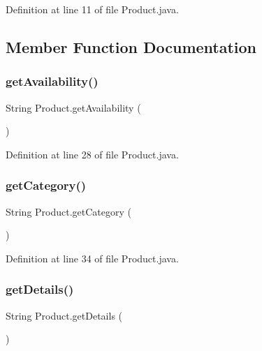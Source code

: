 Definition at line 11 of file Product.\+java.



\subsection{Member Function Documentation}
\mbox{\label{class_product_a26824d57b611d392819d5fe74cc44ed7}} 
\subsubsection{\texorpdfstring{getAvailability()}{getAvailability()}}
{\footnotesize\ttfamily String Product.\+get\+Availability (\begin{DoxyParamCaption}{ }\end{DoxyParamCaption})}



Definition at line 28 of file Product.\+java.

\mbox{\label{class_product_a3fe94b7c87c730e063377298cd06d2f3}} 
\subsubsection{\texorpdfstring{getCategory()}{getCategory()}}
{\footnotesize\ttfamily String Product.\+get\+Category (\begin{DoxyParamCaption}{ }\end{DoxyParamCaption})}



Definition at line 34 of file Product.\+java.

\mbox{\label{class_product_a7e52ee55a2040ed43de668ba06305899}} 
\subsubsection{\texorpdfstring{getDetails()}{getDetails()}}
{\footnotesize\ttfamily String Product.\+get\+Details (\begin{DoxyParamCaption}{ }\end{DoxyParamCaption})}



